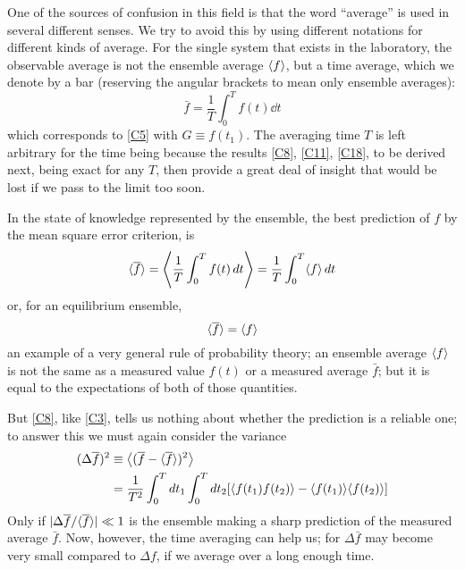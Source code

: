One of the sources of confusion in this field is that the word ``average'' is used in several different senses.
We try to avoid this by using different notations for different kinds of average.
For the single system that exists in the laboratory, the observable average is not the ensemble average $\langle f\rangle$, but a time average, which we denote by a bar (reserving the angular brackets to mean only ensemble averages):
\begin{equation}
	\label{C7}
	\bar{f} = \frac{1}{T} \int_{0}^{T} f(t) \dd t
\end{equation}
which corresponds to \eqref{C5} with $G \equiv f(t_1)$.
The averaging time $T$ is left arbitrary for the time being because the results \eqref{C8}, \eqref{C11}, \eqref{C18}, to be derived next, being exact for any $T$, then provide a great deal of insight that would be lost if we pass to the limit too soon.

In the state of knowledge represented by the ensemble, the best prediction of $f$ by the mean square error criterion, is
\begin{equation*}
	\mean{\bar{f}} = \mean*{\frac{1}{T}\int_{0}^{T} f(t) \dd t} = \frac{1}{T} \int_{0}^{T} \mean{f}\dd t
\end{equation*}
or, for an equilibrium ensemble,
\begin{equation}
	\label{C8}
	\langle\overline{f}\rangle = \langle f\rangle
\end{equation}
an example of a very general rule of probability theory; an ensemble average $\langle f\rangle$ is not the same as a measured value $f(t)$ or a measured average $\bar{f}$; but it is equal to the expectations of both of those quantities.

But \eqref{C8}, like \eqref{C3}, tells us nothing about whether the prediction is a reliable one; to answer this we must again consider the variance
\begin{equation}
	\label{C9}
	\begin{split}
		(\Delta \bar{f})^2
		&\equiv \mean*{(\bar{f} - \mean{\bar{f}})^2}\\
		&= \frac{1}{T^2} \int_{0}^{T} \dd t_1 \int_{0}^{T} \dd t_2 [\mean{f(t_1) f(t_2)} - \mean{f(t_1)}\mean{f(t_2)}]
	\end{split}
\end{equation}
Only if $\lvert\Delta \overline{f}/\langle\overline{f}\rangle\rvert \ll 1$ is the ensemble making a sharp prediction of the measured average $\bar{f}$.
Now, however, the time averaging can help us; for $\Delta \bar{f}$ may become very small compared to $\Delta f$, if we average over a long enough time.

